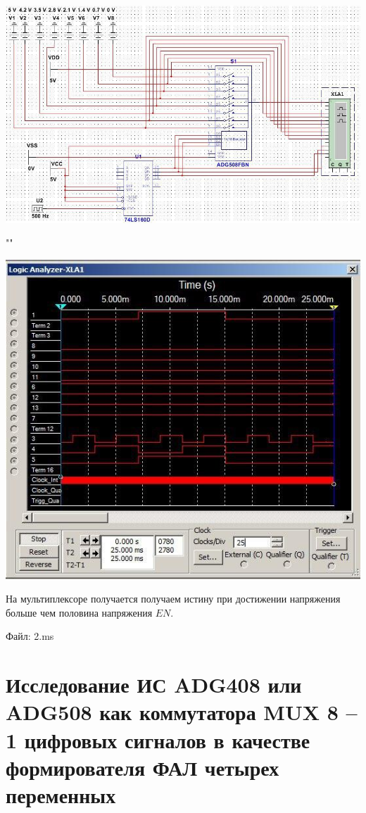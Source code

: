 \documentclass[a4paper,12pt]{article}
\begin{document}
\begin{center}
	\includegraphics[scale=0.7]{../screens/3.jpg}
	
	""
	
	\includegraphics[scale=0.75]{../screens/4.jpg}
\end{center}

\noindent На мультиплексоре получается получаем истину при достижении напряжения больше чем половина напряжения $EN$.\newline

\noindent Файл: 2.ms

\section{Исследование ИС ADG408 или ADG508 как коммутатора MUX 8 – 1 цифровых сигналов в качестве формирователя ФАЛ четырех переменных}
\end{document}
